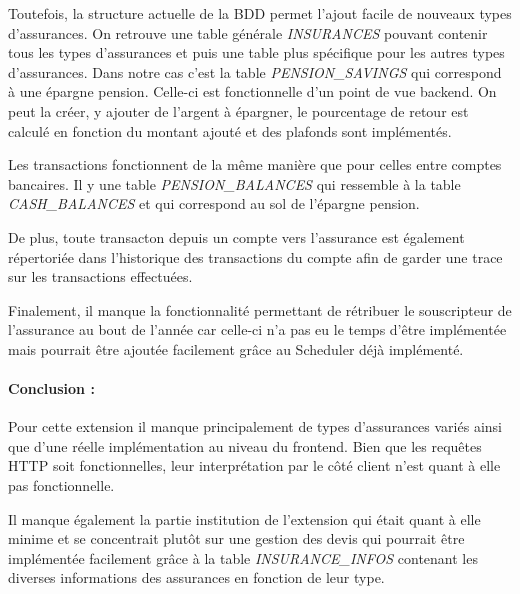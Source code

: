 \documentclass[../rapport.tex]{subfiles}
\begin{document}
			\medskip

			Toutefois, la structure actuelle de la BDD permet l'ajout facile de nouveaux types
			d'assurances. On retrouve une table générale \textit{INSURANCES} pouvant contenir
			tous les types d'assurances et puis une table plus spécifique pour les autres types
			d'assurances. Dans notre cas c'est la table \textit{PENSION\_SAVINGS} qui correspond
			à une épargne pension. Celle-ci est fonctionnelle d'un point de vue backend.
			On peut la créer, y ajouter de l'argent à épargner, le pourcentage de retour 
			est calculé en fonction du montant ajouté et des plafonds sont implémentés.

			\medskip

			Les transactions fonctionnent de la même manière que pour celles entre comptes
			bancaires. Il y une table \textit{PENSION\_BALANCES} qui ressemble à la table
			\textit{CASH\_BALANCES} et qui correspond au sol de l'épargne pension. 
			
			\medskip

			De plus, toute transacton depuis un compte vers l'assurance est également répertoriée
			dans l'historique des transactions du compte afin de garder une trace sur les 
			transactions effectuées.

			\medskip

			Finalement, il manque la fonctionnalité permettant de rétribuer le souscripteur 
			de l'assurance au bout de l'année car celle-ci n'a pas eu le temps d'être implémentée
			mais pourrait être ajoutée facilement grâce au Scheduler déjà implémenté.


			\bigskip

			\paragraph{Conclusion : } Pour cette extension il manque principalement de types
			d'assurances variés ainsi que d'une réelle implémentation au niveau du frontend.
			Bien que les requêtes HTTP soit fonctionnelles, leur interprétation par le côté 
			client n'est quant à elle pas fonctionnelle.

			\medskip

			Il manque également la partie institution de l'extension qui était quant à elle
			minime et se concentrait plutôt sur une gestion des devis qui pourrait être
			implémentée facilement grâce à la table \textit{INSURANCE\_INFOS} contenant les
			diverses informations des assurances en fonction de leur type.
			

			\newpage
\end{document}
